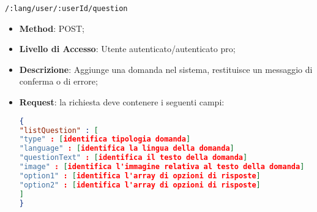 	
	\item \texttt{/:lang/user/:userId/question}
		\begin{itemize}
			\item \textbf{Method}: POST;
			\item \textbf{Livello di Accesso}: Utente autenticato/autenticato pro;
			\item \textbf{Descrizione}: Aggiunge una domanda nel sistema, restituisce un messaggio di conferma o di errore;
			\item \textbf{Request}: la richiesta deve contenere i seguenti campi:
\begin{lstlisting}[language=json,firstnumber=1]
{
"listQuestion" : [ 
"type" : [identifica tipologia domanda]
"language" : [identifica la lingua della domanda]
"questionText" : [identifica il testo della domanda]
"image" : [identifica l'immagine relativa al testo della domanda]
"option1" : [identifica l'array di opzioni di risposte]
"option2" : [identifica l'array di opzioni di risposte]
]
}
\end{lstlisting}
		\end{itemize}